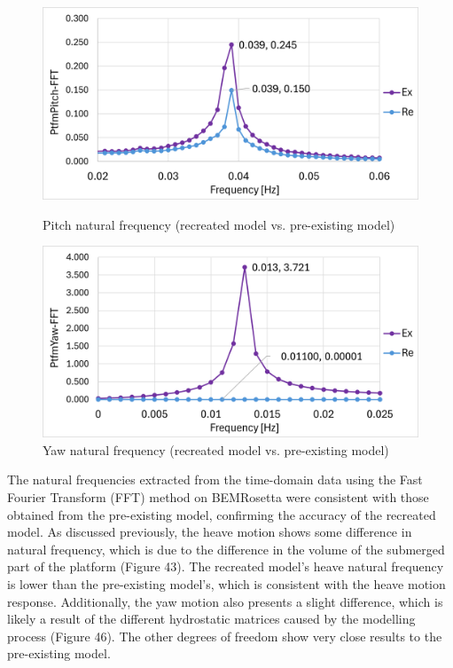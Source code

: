 \documentclass[a4paper, 11pt]{article}
\begin{document}
\begin{figure}[H]
    \begin{minipage}{0.47\textwidth}
        \centering
        \includegraphics[width=1\textwidth]{nat_freq_pitch_1.png}
        \caption{\small Pitch natural frequency (recreated model vs. pre-existing model)}
        \label{fig:nat_freq_pitch_recreated}
    \end{minipage}
    \hfill
    \begin{minipage}{0.48\textwidth}
        \centering
        \includegraphics[width=1\textwidth]{nat_freq_yaw_1.png}
        \caption{\small Yaw natural frequency (recreated model vs. pre-existing model)}
        \label{fig:nat_freq_yaw_recreated}
    \end{minipage}
\end{figure}


The natural frequencies extracted from the time-domain data using the Fast Fourier Transform (FFT) method on BEMRosetta were consistent with those obtained from the pre-existing model, confirming the accuracy of the recreated model. As discussed previously, the heave motion shows some difference in natural frequency, which is due to the difference in the volume of the submerged part of the platform (Figure 43). The recreated model's heave natural frequency is lower than the pre-existing model's, which is consistent with the heave motion response. Additionally, the yaw motion also presents a slight difference, which is likely a result of the different hydrostatic matrices caused by the modelling process (Figure 46). The other degrees of freedom show very close results to the pre-existing model.
\end{document}
